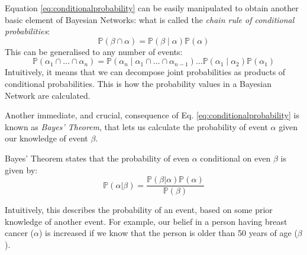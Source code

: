 Equation \ref{eq:conditionalprobability} can be easily manipulated to obtain another basic element of Bayesian Networks: what is called the \textit{chain rule of conditional probabilities}:
\begin{equation} \label{eq:chainrule}
	\mathbb{P}(\beta \cap \alpha) = \mathbb{P}(\beta \mid \alpha) \mathbb{P}(\alpha)
\end{equation}
This can be generalised to any number of events:
\begin{equation} \label{eq:chainrule}
	\mathbb{P}(\alpha_1 \cap \ldots \cap \alpha_n) = \mathbb{P}(\alpha_n \mid \alpha_1 \cap \ldots \cap \alpha_{n-1}) \ldots \mathbb{P}(\alpha_1 \mid \alpha_2 ) \mathbb{P}(\alpha_1) 
\end{equation}
Intuitively, it means that we can decompose joint probabilities as products of conditional probabilities.  
This is how the probability values in a Bayesian Network are calculated.

Another immediate, and crucial, consequence of Eq. \ref{eq:conditionalprobability} is known as \textit{Bayes' Theorem}, that lets us calculate the probability of event $\alpha$ given our knowledge of event $\beta$.
\begin{definition} \label{eq:bayes-theorem}
	Bayes' Theorem states that the probability of even $\alpha$ conditional on even $\beta$ is given by:
	\begin{equation}
		\mathbb{P}(\alpha | \beta)=\frac{\mathbb{P}(\beta | \alpha) \mathbb{P}(\alpha)}{\mathbb{P}(\beta)}
	\end{equation}
\end{definition}
Intuitively, this describes the probability of an event, based on some prior knowledge of another event.
For example, our belief in a person having breast cancer ($\alpha$) is increased if we know that the person is older than 50 years of age ($\beta$).

